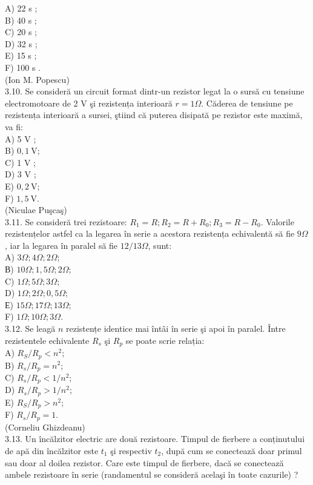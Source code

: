 \documentclass[10pt]{article}
\begin{document}
A) 22 s ;\\
B) 40 s ;\\
C) 20 s ;\\
D) 32 s ;\\
E) 15 s ;\\
F) 100 s .\\
(Ion M. Popescu)\\
3.10. Se consideră un circuit format dintr-un rezistor legat la o sursă cu tensiune electromotoare de 2 V şi rezistența interioară $r=1 \Omega$. Căderea de tensiune pe rezistența interioară a sursei, ştiind că puterea disipată pe rezistor este maximă, va fi:\\
A) 5 V ;\\
B) $0,1 \mathrm{~V}$;\\
C) 1 V ;\\
D) 3 V ;\\
E) $0,2 \mathrm{~V}$;\\
F) $1,5 \mathrm{~V}$.\\
(Niculae Puşcaş)\\
3.11. Se consideră trei rezistoare: $R_{1}=R ; R_{2}=R+R_{0} ; R_{3}=R-R_{0}$. Valorile rezistențelor astfel ca la legarea în serie a acestora rezistența echivalentă să fie $9 \Omega$, iar la legarea în paralel să fie $12 / 13 \Omega$, sunt:\\
A) $3 \Omega ; 4 \Omega ; 2 \Omega$;\\
В) $10 \Omega ; 1,5 \Omega ; 2 \Omega$;\\
C) $1 \Omega ; 5 \Omega ; 3 \Omega$;\\
D) $1 \Omega ; 2 \Omega ; 0,5 \Omega$;\\
Е) $15 \Omega ; 17 \Omega ; 13 \Omega$;\\
F) $1 \Omega ; 10 \Omega ; 3 \Omega$.\\
3.12. Se leagă $n$ rezistențe identice mai întâi în serie şi apoi în paralel. Între rezistentele echivalente $R_{s}$ şi $R_{p}$ se poate scrie relația:\\
A) $R_{S} / R_{p}<n^{2}$;\\
B) $R_{s} / R_{p}=n^{2}$;\\
C) $R_{s} / R_{p}<1 / n^{2}$;\\
D) $R_{s} / R_{p}>1 / n^{2}$;\\
E) $R_{S} / R_{p}>n^{2}$;\\
F) $R_{s} / R_{p}=1$.\\
(Corneliu Ghizdeanu)\\
3.13. Un încălzitor electric are două rezistoare. Timpul de fierbere a conținutului de apă din încălzitor este $t_{1}$ şi respectiv $t_{2}$, după cum se conectează doar primul sau doar al doilea rezistor. Care este timpul de fierbere, dacă se conectează ambele rezistoare în serie (randamentul se consideră acelaşi în toate cazurile) ?\\
\end{document}
